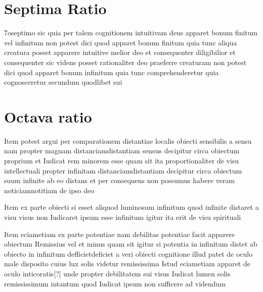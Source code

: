 \documentclass[twoside, openright]{report}
\begin{document}
        \bigskip
         \section*{Septima Ratio} 
        \pstart
        7oseptimo sic quia per talem cognitionem intuitivam deus apparet bonum finitum vel infinitum non potest dici quod apparet bonum finitum quia tunc aliqua creatura posset apparere intuitive melior deo et consequenter diligibilior et consequenter sic videns posset rationaliter deo praeferre creaturam non potest dici quod apparet bonum infinitum quia tunc comprehenderetur quia cognosceretur secundum quodlibet sui
        \pend
      
        \bigskip
         \section*{Octava ratio} 
        \pstart
        Item potest argui per comparationem distantiae localis obiecti sensibilis a sensu nam propter magnam distanciamdistantiam sensus decipitur circa obiectum proprium et Iudicat rem minorem esse quam sit ita proportionaliter de visu intellectuali propter infinitam distanciamdistantiam decipitur circa obiectum suum infinite ab eo distans et per consequens non possumus habere veram noticiamnotitiam de ipso deo
        \pend
     
        \pstart
        Item ex parte obiecti si esset aliquod luminosum infinitum quod infinite distaret a visu visus non Iudicaret ipsum esse infinitum igitur ita erit de visu spirituali
        \pend
     
        \pstart
        Item eciametiam ex parte potentiae nam debilitas potentiae facit apparere obiectum Remissius vel et minus quam sit igitur si potentia in infinitum distet ab obiecto in infinitum defficietdeficiet a veri obiecti cognitione illud patet de oculo male disposito cuius lux solis videtur remississima Istud eciametiam apparet de oculo inticoratis[?] unde propter debilitatem sui visus Iudicat lumen solis remississimum intantum quod Iudicat ipsum non sufficere ad videndum
        \pend
     
\end{document}
